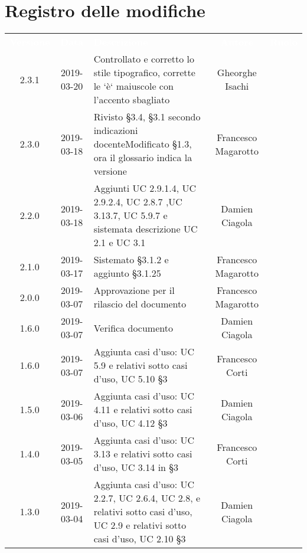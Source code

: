\section*{Registro delle modifiche}
{
	\renewcommand{\arraystretch}{1.5}
	\centering
	\begin{longtable}{ c c C{6cm} c c }
		\textcolor{white}{\textbf{Versione}} & \textcolor{white}{\textbf{Data}} & \textcolor{white}{\textbf{Descrizione}} & \textcolor{white}{\textbf{Autore}} & \textcolor{white}{\textbf{Ruolo}}\\
		2.3.1 &
		2019-03-20 &
		Controllato e corretto lo stile tipografico, corrette le `è` maiuscole con l'accento sbagliato   &
		Gheorghe Isachi &
		\reda{} \\ 

		2.3.0 &
		2019-03-18 &
		Rivisto §3.4, §3.1 secondo indicazioni docente\newline Modificato §1.3, ora il glossario indica la versione   &
		Francesco Magarotto &
		\reda{} \\ 
		
		2.2.0 &	
		2019-03-18 &	
		Aggiunti UC 2.9.1.4, UC 2.9.2.4, UC 2.8.7 ,UC 3.13.7, UC 5.9.7 e sistemata descrizione UC 2.1 e UC 3.1 &
		Damien Ciagola &
		\reda{} \\ 
				
		2.1.0 &
		2019-03-17 &
		Sistemato §3.1.2 e aggiunto §3.1.25 &
		Francesco Magarotto &
		\reda{} \\ 
		
		2.0.0 &
		2019-03-07 &
		Approvazione per il rilascio del documento &
		Francesco Magarotto &
		\Res{} \\
		
		1.6.0 & 
		2019-03-07 &  
		Verifica documento &	
		Damien Ciagola &	
		\ver{} \\
		
		1.6.0 &
		2019-03-07 &
		Aggiunta casi d'uso: UC 5.9 e relativi sotto casi d'uso, UC 5.10 §3 &
		Francesco Corti&
		\reda{} \\
		
		1.5.0 &
		2019-03-06 &
		Aggiunta casi d'uso: UC 4.11 e relativi sotto casi d'uso, UC 4.12 §3 &
		Damien Ciagola&
		\reda{} \\
		
		1.4.0 &
		2019-03-05 &
		Aggiunta casi d'uso: UC 3.13 e relativi sotto casi d'uso, UC 3.14 in §3 &
		Francesco Corti&
		\reda{} \\

		1.3.0 &
		2019-03-04 &
		Aggiunta casi d'uso: UC 2.2.7, UC 2.6.4, UC 2.8, e relativi sotto casi d'uso, UC 2.9 e relativi sotto casi d'uso, UC 2.10  §3 &
		Damien Ciagola&
		\reda{} \\
		

\end{longtable}}
